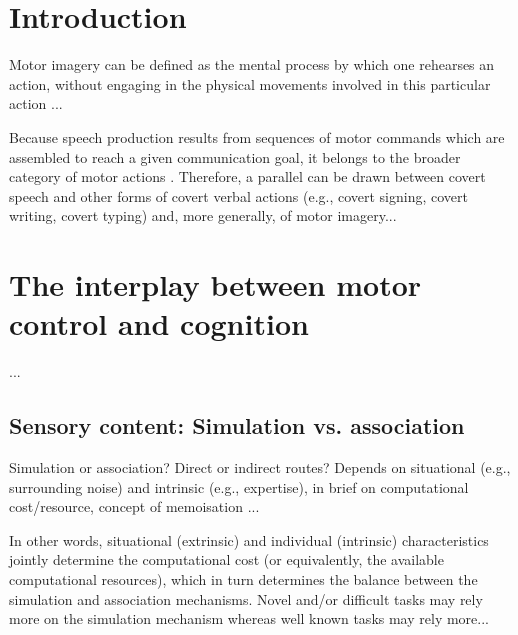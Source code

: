 \documentclass[utf8]{frontiersSCNS} %
\begin{document}

\newpage

\section{Introduction}


Motor imagery can be defined as the mental process by which one rehearses an action, without engaging in the physical movements involved in this particular action \citep{}...

Because speech production results from sequences of motor commands which are assembled to reach a given communication goal, it belongs to the broader category of motor actions \citep{jeannerod_motor_2006}. Therefore, a parallel can be drawn between covert speech and other forms of covert verbal actions (e.g., covert signing, covert writing, covert typing) and, more generally, of motor imagery...


\section{The interplay between motor control and cognition}

...

\subsection{Sensory content: Simulation vs. association}

Simulation or association? Direct or indirect routes? Depends on situational (e.g., surrounding noise) and intrinsic (e.g., expertise), in brief on computational cost/resource, concept of memoisation \citep{dasgupta_memory_2021}...

In other words, situational (extrinsic) and individual (intrinsic) characteristics jointly determine the computational cost (or equivalently, the available computational resources), which in turn determines the balance between the simulation and association mechanisms. Novel and/or difficult tasks may rely more on the simulation mechanism whereas well known tasks may rely more...
\end{document}

